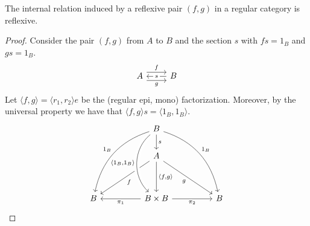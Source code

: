 \begin{mainbox}{}
    \begin{prop}\label{relation induced by a reflexive pair is reflexive}
        The internal relation induced by a reflexive pair $(f,g)$ in a regular category is reflexive.
    \end{prop}
\end{mainbox}

\begin{subbox}{}
    \begin{proof}
        Consider the pair $(f,g)$ from $A$ to $B$ and the section $s$ with $fs=1_B$ and $gs=1_B$.
\[
\begin{tikzcd}
    A \arrow[r, "f", shift left=2] \arrow[r, "g"', shift right=2] & B \arrow[l, "s" description]
    \end{tikzcd}
\]
Let $\langle f,g \rangle = \langle r_1,r_2\rangle e$ be the (regular epi, mono) factorization. Moreover, by the universal property we have that $\langle f,g \rangle s = \langle 1_B,1_B \rangle$.
\[
\begin{tikzcd}
    &  & B \arrow[d, "s"] \arrow[llddd, "1_B"', bend right] \arrow[rrddd, "1_B", bend left] &  &   \\
    &  & A \arrow[dd, "{\langle f,g \rangle}"] \arrow[lldd, "f"] \arrow[rrdd, "g"']                                                                  &  &   \\
    &  &                                                                                                                                             &  &   \\
  B &  & B \times B \arrow[rr, "\pi_2"'] \arrow[ll, "\pi_1"] \arrow[from=uuu, "{\langle 1_B,1_B \rangle}"', bend right=49, crossing over]                                                                                         &  & B

\end{tikzcd}\]
\end{proof}
\end{subbox}
